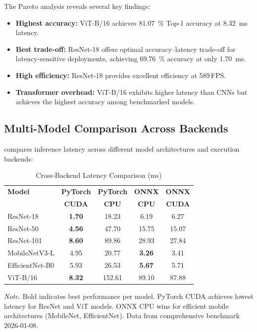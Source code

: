 \documentclass[10pt,twocolumn,a4paper]{article}
\theoremstyle{definition}
\theoremstyle{plain}
\newcommand{\fpssuffix}{\,FPS}
\begin{document}
The Pareto analysis reveals several key findings:
\begin{itemize}
    \item \textbf{Highest accuracy:} ViT-B/16 achieves \SI{81.07}{\percent} Top-1 accuracy at \SI{8.32}{\milli\second} latency.
    \item \textbf{Best trade-off:} ResNet-18 offers optimal accuracy--latency trade-off for latency-sensitive deployments, achieving \SI{69.76}{\percent} accuracy at only \SI{1.70}{\milli\second}.
    \item \textbf{High efficiency:} ResNet-18 provides excellent efficiency at \num{589}\fpssuffix{}.
    \item \textbf{Transformer overhead:} ViT-B/16 exhibits higher latency than CNNs but achieves the highest accuracy among benchmarked models.
\end{itemize}

\subsection{Multi-Model Comparison Across Backends}

 compares inference latency across different model architectures and execution backends:

\begin{table}[t]
\centering
\caption{Cross-Backend Latency Comparison (ms)}
\label{tab:multimodel}
\scriptsize
\setlength{\tabcolsep}{2.5pt}
\begin{tabular}{@{}lcccc@{}}
\toprule
\textbf{Model} & \textbf{PyTorch} & \textbf{PyTorch} & \textbf{ONNX} & \textbf{ONNX} \\
 & \textbf{CUDA} & \textbf{CPU} & \textbf{CPU} & \textbf{CUDA} \\
\midrule
ResNet-18 & \textbf{1.70} & 18.23 & 6.19 & 6.27 \\
ResNet-50 & \textbf{4.56} & 47.70 & 15.75 & 15.07 \\
ResNet-101 & \textbf{8.60} & 89.86 & 28.93 & 27.84 \\
MobileNetV3-L & 4.95 & 20.77 & \textbf{3.26} & 3.41 \\
EfficientNet-B0 & 5.93 & 26.53 & \textbf{5.67} & 5.71 \\
ViT-B/16 & \textbf{8.32} & 152.61 & 89.10 & 87.88 \\
\bottomrule
\end{tabular}

\vspace{0.5em}
\noindent\textit{Note.} Bold indicates best performance per model. PyTorch CUDA achieves lowest latency for ResNet and ViT models. ONNX CPU wins for efficient mobile architectures (MobileNet, EfficientNet). Data from comprehensive benchmark 2026-01-08.
\end{table}
\end{document}
